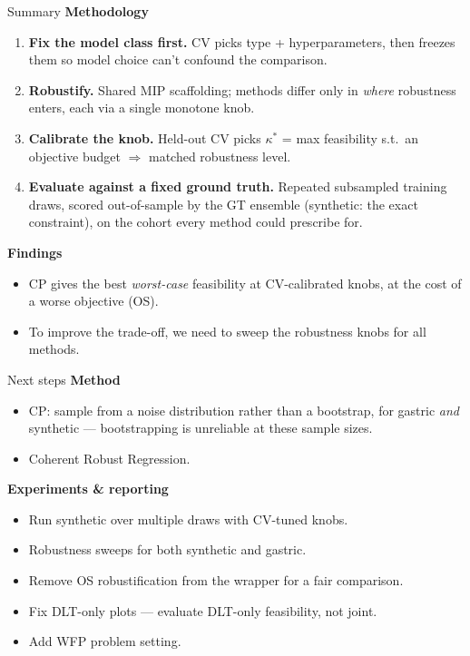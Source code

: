 \documentclass{beamer}
\begin{document}
\begin{frame}{Summary}
  \small
  \textbf{Methodology}
  \begin{enumerate}
    \item \textbf{Fix the model class first.} CV picks type + hyperparameters,
    then freezes them so model choice can't confound the comparison.
    \item \textbf{Robustify.} Shared MIP scaffolding; methods differ only in
      \emph{where} robustness enters, each via a single monotone knob.
    \item \textbf{Calibrate the knob.} Held-out CV picks $\kappa^\ast$ = max
      feasibility s.t.\ an objective budget $\Rightarrow$ matched robustness level.
    \item \textbf{Evaluate against a fixed ground truth.} Repeated subsampled
      training draws, scored out-of-sample by the GT ensemble (synthetic: the exact
      constraint), on the cohort every method could prescribe for.
  \end{enumerate}
  \medskip
  \textbf{Findings}
  \begin{itemize}
    \item CP gives the best \emph{worst-case} feasibility at CV-calibrated knobs,
      at the cost of a worse objective (OS).
    \item To improve the trade-off, we need to sweep the robustness knobs for all methods.
  \end{itemize}
\end{frame}

\begin{frame}{Next steps}
  \textbf{Method}
  \begin{itemize}
    \item CP: sample from a noise distribution rather
      than a bootstrap, for gastric \emph{and} synthetic --- bootstrapping is
      unreliable at these sample sizes.
    \item Coherent Robust Regression.
  \end{itemize}
  \medskip
  \textbf{Experiments \& reporting}
  \begin{itemize}
    \item Run synthetic over multiple draws with CV-tuned knobs.
    \item Robustness sweeps for both synthetic and gastric.
    \item Remove OS robustification from the wrapper for a fair comparison.
    \item Fix DLT-only plots --- evaluate DLT-only feasibility, not joint.
    \item Add WFP problem setting.
  \end{itemize}
\end{frame}
\end{document}
